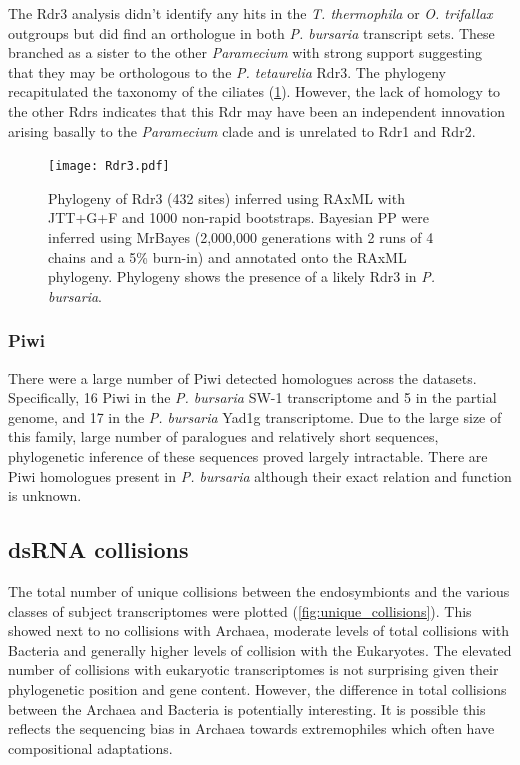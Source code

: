 The Rdr3 analysis didn't identify any hits in the \textit{T. thermophila}
or \textit{O. trifallax} outgroups but did find an orthologue
in both \textit{P. bursaria} transcript sets.  These branched
as a sister to the other \textit{Paramecium} with strong support
suggesting that they may be orthologous to the \textit{P. tetaurelia}
Rdr3. The phylogeny recapitulated the taxonomy of the ciliates (\cref{fig:rdr3_phylo}).
However, the lack of homology to the other Rdrs indicates that
this Rdr may have been an independent innovation arising basally to the \textit{Paramecium}
clade and is unrelated to Rdr1 and Rdr2.

\begin{figure}
    \texttt{[image: Rdr3.pdf]}
    \caption[Rdr3 phylogeny]{Phylogeny of Rdr3 (432 sites)
        inferred using RAxML with JTT+G+F and 1000 non-rapid
        bootstraps. Bayesian PP were inferred using MrBayes
        (2,000,000 generations with 2 runs of 4 chains and a 5\% burn-in)
        and annotated onto the RAxML phylogeny.  Phylogeny
        shows the presence of a likely Rdr3 in \textit{P. bursaria}.}
    \label{fig:rdr3_phylo}
\end{figure}

\subsubsection{Piwi}

There were a large number of Piwi detected homologues across
the datasets. Specifically, 16 Piwi in the \textit{P. bursaria} SW-1
transcriptome and 5 in the partial genome, and 17 in the \textit{P. 
bursaria} Yad1g transcriptome.
Due to the large size of this family, large number of paralogues
and relatively short sequences, phylogenetic inference
of these sequences proved largely intractable. There are Piwi
homologues present in \textit{P. bursaria} although their exact
relation and function is unknown.


\subsection{dsRNA collisions}

The total number of unique collisions between the endosymbionts and 
the various classes of subject transcriptomes were plotted
(\cref{fig:unique_collisions}). 
This showed next to no collisions with Archaea, moderate levels of total
collisions with Bacteria and generally higher levels of collision
with the Eukaryotes.  The elevated number of collisions with eukaryotic
transcriptomes is not surprising given their 
phylogenetic position and gene content.  However, the difference in total 
collisions between the Archaea and Bacteria is potentially interesting. 
It is possible this reflects the sequencing bias in Archaea
towards extremophiles which often have compositional adaptations.



